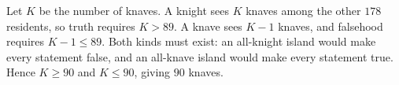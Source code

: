 Let $K$ be the number of knaves. A knight sees $K$ knaves among the other $178$ residents, so truth requires $K>89$. A knave sees $K-1$ knaves, and falsehood requires $K-1\le89$. Both kinds must exist: an all-knight island would make every statement false, and an all-knave island would make every statement true. Hence $K\ge90$ and $K\le90$, giving $\boxed{90}$ knaves.
